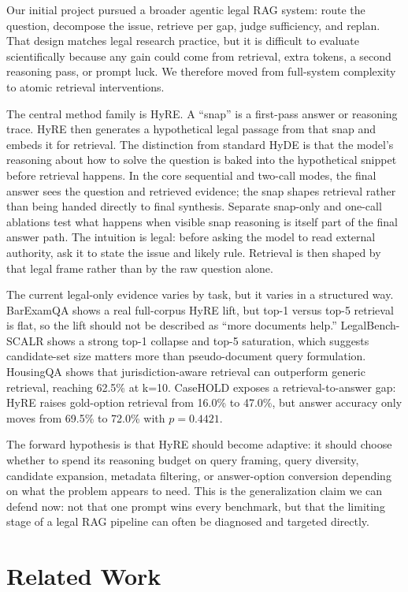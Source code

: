 \documentclass{article}
\newcommand{\hyre}{HyRE}
\begin{document}
Our initial project pursued a broader agentic legal RAG system: route the
question, decompose the issue, retrieve per gap, judge sufficiency, and
replan. That design matches legal research practice, but it is difficult to
evaluate scientifically because any gain could come from retrieval, extra
tokens, a second reasoning pass, or prompt luck. We therefore moved from
full-system complexity to atomic retrieval interventions.

The central method family is \hyre{}. A ``snap'' is a first-pass answer or
reasoning trace. \hyre{} then generates a hypothetical legal passage from that
snap and embeds it for retrieval. The distinction from standard HyDE is that
the model's reasoning about how to solve the question is baked into the
hypothetical snippet before retrieval happens. In the core sequential and
two-call modes, the final answer sees the question and retrieved evidence; the
snap shapes retrieval rather than being handed directly to final synthesis.
Separate snap-only and one-call ablations test what happens when visible snap
reasoning is itself part of the final answer path. The intuition is legal:
before asking the model to read external authority, ask it to state the issue
and likely rule. Retrieval is then shaped by that legal frame rather than by
the raw question alone.

The current legal-only evidence varies by task, but it varies in a structured
way.
BarExamQA shows a real full-corpus \hyre{} lift, but top-1 versus top-5
retrieval is flat, so the lift should not be described as ``more documents
help.'' LegalBench-SCALR shows a strong top-1 collapse and top-5 saturation,
which suggests candidate-set size matters more than pseudo-document query
formulation. HousingQA shows that jurisdiction-aware retrieval can outperform
generic retrieval, reaching 62.5\% at k=10. CaseHOLD exposes a
retrieval-to-answer gap: \hyre{} raises gold-option retrieval from 16.0\% to
47.0\%, but answer accuracy only moves from 69.5\% to 72.0\% with
$p=0.4421$.

The forward hypothesis is that \hyre{} should become adaptive: it should
choose whether to spend its reasoning budget on query framing, query diversity,
candidate expansion, metadata filtering, or answer-option conversion depending
on what the problem appears to need. This is the generalization claim we can
defend now: not that one prompt wins every benchmark, but that the limiting
stage of a legal RAG pipeline can often be diagnosed and targeted directly.

\section{Related Work}
\end{document}
